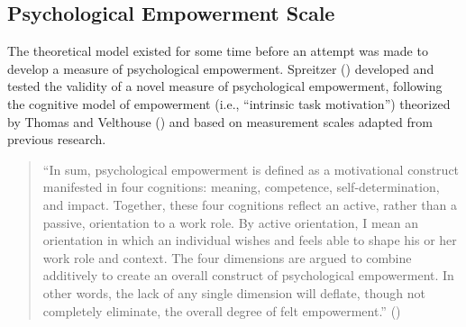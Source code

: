 \documentclass[
  11pt,
  a4paper,
]{article}
\begin{document}
\subsection{Psychological Empowerment
Scale}\label{psychological-empowerment-scale}

The theoretical model existed for some time before an attempt was made
to develop a measure of psychological empowerment. Spreitzer
() developed and tested the validity
of a novel measure of psychological empowerment, following the cognitive
model of empowerment (i.e., ``intrinsic task motivation'') theorized by
Thomas and Velthouse () and based on
measurement scales adapted from previous research.

\begin{quote}
``In sum, psychological empowerment is defined as a motivational
construct manifested in four cognitions: meaning, competence,
self-determination, and impact. Together, these four cognitions reflect
an active, rather than a passive, orientation to a work role. By active
orientation, I mean an orientation in which an individual wishes and
feels able to shape his or her work role and context. The four
dimensions are argued to combine additively to create an overall
construct of psychological empowerment. In other words, the lack of any
single dimension will deflate, though not completely eliminate, the
overall degree of felt empowerment.''
()
\end{quote}
\end{document}
